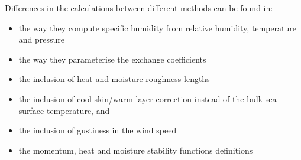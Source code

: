 \documentclass[letterpaper,10pt,english]{sphinxmanual}
\begin{document}
Differences in the calculations between different methods can be found in:
\begin{itemize}
\item the way they compute specific humidity from relative humidity, temperature and pressure
\item the way they parameterise the exchange coefficients
\item the inclusion of heat and moisture roughness lengths
\item the inclusion of cool skin/warm layer correction instead of the bulk sea surface temperature, and
\item the inclusion of gustiness in the wind speed
\item the momentum, heat and moisture stability functions definitions
\end{itemize}
\end{document}
